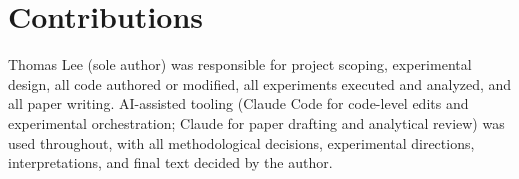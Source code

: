 \documentclass{article}
\begin{document}


\section*{Contributions}
Thomas Lee (sole author) was responsible for project scoping,
experimental design, all code authored or modified, all experiments
executed and analyzed, and all paper writing. AI-assisted tooling
(Claude Code for code-level edits and experimental orchestration;
Claude for paper drafting and analytical review) was used throughout,
with all methodological decisions, experimental directions,
interpretations, and final text decided by the author.

\appendix







\end{document}
